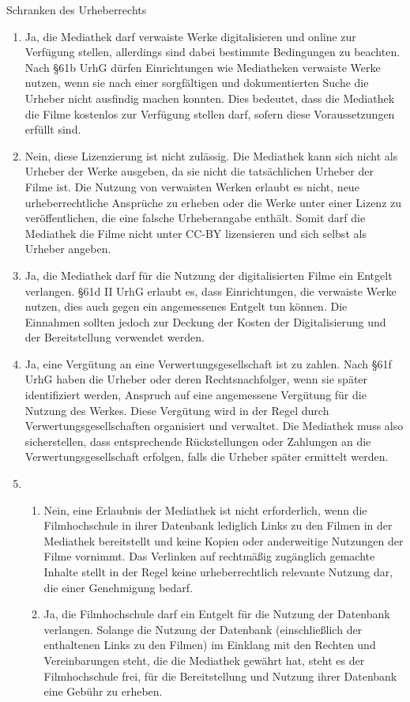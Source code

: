 \documentclass{article}
\begin{document}
\begin{exercise}{Schranken des Urheberrechts}
  \begin{solution}
    \begin{enumerate}
      \item Ja, die Mediathek darf verwaiste Werke digitalisieren und online zur Verfügung stellen, allerdings sind dabei bestimmte Bedingungen zu beachten. Nach §61b UrhG dürfen Einrichtungen wie Mediatheken verwaiste Werke nutzen, wenn sie nach einer sorgfältigen und dokumentierten Suche die Urheber nicht ausfindig machen konnten. Dies bedeutet, dass die Mediathek die Filme kostenlos zur Verfügung stellen darf, sofern diese Voraussetzungen erfüllt sind.
      \item Nein, diese Lizenzierung ist nicht zulässig. Die Mediathek kann sich nicht als Urheber der Werke ausgeben, da sie nicht die tatsächlichen Urheber der Filme ist. Die Nutzung von verwaisten Werken erlaubt es nicht, neue urheberrechtliche Ansprüche zu erheben oder die Werke unter einer Lizenz zu veröffentlichen, die eine falsche Urheberangabe enthält. Somit darf die Mediathek die Filme nicht unter CC-BY lizensieren und sich selbst als Urheber angeben.
      \item Ja, die Mediathek darf für die Nutzung der digitalisierten Filme ein Entgelt verlangen. §61d II UrhG erlaubt es, dass Einrichtungen, die verwaiste Werke nutzen, dies auch gegen ein angemessenes Entgelt tun können. Die Einnahmen sollten jedoch zur Deckung der Kosten der Digitalisierung und der Bereitstellung verwendet werden.
      \item Ja, eine Vergütung an eine Verwertungsgesellschaft ist zu zahlen. Nach §61f UrhG haben die Urheber oder deren Rechtsnachfolger, wenn sie später identifiziert werden, Anspruch auf eine angemessene Vergütung für die Nutzung des Werkes. Diese Vergütung wird in der Regel durch Verwertungsgesellschaften organisiert und verwaltet. Die Mediathek muss also sicherstellen, dass entsprechende Rückstellungen oder Zahlungen an die Verwertungsgesellschaft erfolgen, falls die Urheber später ermittelt werden.
      \item
            \begin{enumerate}
              \item Nein, eine Erlaubnis der Mediathek ist nicht erforderlich, wenn die Filmhochschule in ihrer Datenbank lediglich Links zu den Filmen in der Mediathek bereitstellt und keine Kopien oder anderweitige Nutzungen der Filme vornimmt. Das Verlinken auf rechtmäßig zugänglich gemachte Inhalte stellt in der Regel keine urheberrechtlich relevante Nutzung dar, die einer Genehmigung bedarf.
              \item Ja, die Filmhochschule darf ein Entgelt für die Nutzung der Datenbank verlangen. Solange die Nutzung der Datenbank (einschließlich der enthaltenen Links zu den Filmen) im Einklang mit den Rechten und Vereinbarungen steht, die die Mediathek gewährt hat, steht es der Filmhochschule frei, für die Bereitstellung und Nutzung ihrer Datenbank eine Gebühr zu erheben.
            \end{enumerate}
    \end{enumerate}
  \end{solution}
\end{exercise}
\end{document}
